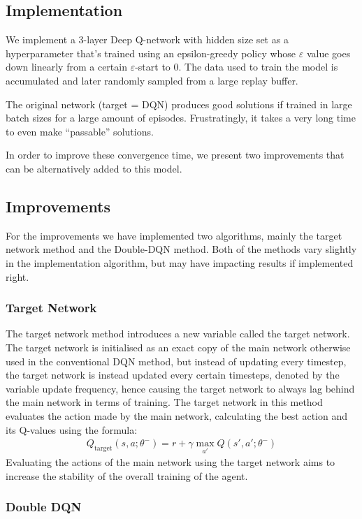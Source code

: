 \newpage{}
\subsection{Implementation}
We implement a 3-layer Deep Q-network with hidden size set as a hyperparameter that's trained using an epsilon-greedy policy whose $\varepsilon$ value goes down linearly from a certain $\varepsilon$-start to 0.
The data used to train the model is accumulated and later randomly sampled from a large replay buffer.

The original network (target = DQN) produces good solutions if trained in large batch sizes for a large amount of episodes.
Frustratingly, it takes a very long time to even make ``passable'' solutions.

In order to improve these convergence time, we present two improvements that can be alternatively added to this model.


\subsection{Improvements}
For the improvements we have implemented two algorithms, mainly the target network method and the
Double-DQN method. Both of the methods vary slightly in the implementation algorithm, but may have
impacting results if implemented right.
\subsubsection{Target Network}
The target network method introduces a new variable called the target network. The target network is initialised as an exact copy of the main network otherwise used in the conventional DQN method, but instead of updating every timestep, the target network is instead updated every certain timesteps, denoted by the variable update frequency, hence causing the target network to always lag behind the main network in terms of training.
The target network in this method evaluates the action made by the main network, calculating the best action and its Q-values using the formula:
\begin{align*}
    Q_{\text{target}}(s, a ; \theta^{-}) = r + \gamma \max_{a'} Q(s', a' ; \theta^{-})
\end{align*}
Evaluating the actions of the main network using the target network aims to increase the stability of the
overall training of the agent.

\subsubsection{Double DQN}

